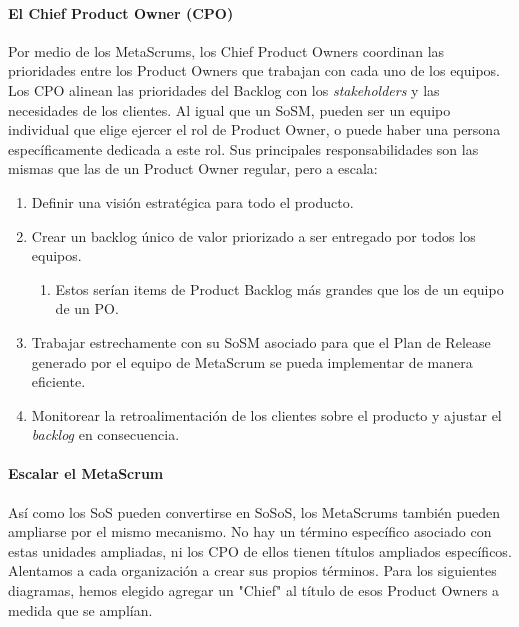 \documentclass{article} %
\begin{document}
\noindent \textbf{\underbar{}}

\noindent \eject 

\noindent 
\paragraph{El Chief Product Owner (CPO)}

\noindent 

\noindent Por medio de los MetaScrums, los Chief Product Owners coordinan las prioridades entre los Product Owners que trabajan con cada uno de los equipos. Los CPO alinean las prioridades del Backlog con los \textit{stakeholders }y las necesidades de los clientes. Al igual que un SoSM, pueden ser un equipo individual que elige ejercer el rol de Product Owner, o puede haber una persona espec\'{i}ficamente dedicada a este rol. Sus principales responsabilidades son las mismas que las de un Product Owner regular, pero a escala:

\noindent 

\begin{enumerate}
\item  Definir una visi\'{o}n estrat\'{e}gica para todo el producto.

\item  Crear un backlog \'{u}nico de valor priorizado a ser entregado por todos los equipos.

\begin{enumerate}
\item  Estos ser\'{i}an items de Product Backlog m\'{a}s grandes que los de un equipo de un PO.
\end{enumerate}

\item  Trabajar estrechamente con su SoSM asociado para que el Plan de Release generado por el equipo de MetaScrum se pueda implementar de manera eficiente.

\item  Monitorear la retroalimentaci\'{o}n\textit{ }de los clientes sobre el producto y ajustar el \textit{backlog }en consecuencia.
\end{enumerate}

\noindent 
\paragraph{Escalar el MetaScrum}

\noindent 

\noindent As\'{i} como los SoS pueden convertirse en SoSoS, los MetaScrums tambi\'{e}n pueden ampliarse por el mismo mecanismo. No hay un t\'{e}rmino espec\'{i}fico asociado con estas unidades ampliadas, ni los CPO de ellos tienen t\'{i}tulos ampliados espec\'{i}ficos. Alentamos a cada organizaci\'{o}n a crear sus propios t\'{e}rminos. Para los siguientes diagramas, hemos elegido agregar un "Chief" al t\'{i}tulo de esos Product Owners a medida que se ampl\'{i}an.
\end{document}
